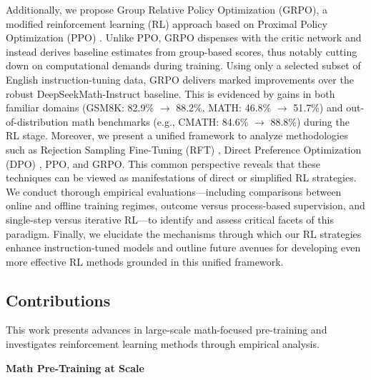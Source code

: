 Additionally, we propose Group Relative Policy Optimization (GRPO), a modified reinforcement learning (RL) approach based on Proximal Policy Optimization (PPO) \citep{schulman2017proximal}. Unlike PPO, GRPO dispenses with the critic network and instead derives baseline estimates from group-based scores, thus notably cutting down on computational demands during training. Using only a selected subset of English instruction-tuning data, GRPO delivers marked improvements over the robust DeepSeekMath-Instruct baseline. This is evidenced by gains in both familiar domains (GSM8K: 82.9\% $\rightarrow$ 88.2\%, MATH: 46.8\% $\rightarrow$ 51.7\%) and out-of-distribution math benchmarks (e.g., CMATH: 84.6\% $\rightarrow$ 88.8\%) during the RL stage. Moreover, we present a unified framework to analyze methodologies such as Rejection Sampling Fine-Tuning (RFT) \citep{yuan2023scaling}, Direct Preference Optimization (DPO) \citep{dpo}, PPO, and GRPO. This common perspective reveals that these techniques can be viewed as manifestations of direct or simplified RL strategies. We conduct thorough empirical evaluations—including comparisons between online and offline training regimes, outcome versus process-based supervision, and single-step versus iterative RL—to identify and assess critical facets of this paradigm. Finally, we elucidate the mechanisms through which our RL strategies enhance instruction-tuned models and outline future avenues for developing even more effective RL methods grounded in this unified framework.

\subsection{Contributions}
This work presents advances in large-scale math-focused pre-training and investigates reinforcement learning methods through empirical analysis.

\textbf{Math Pre-Training at Scale}

